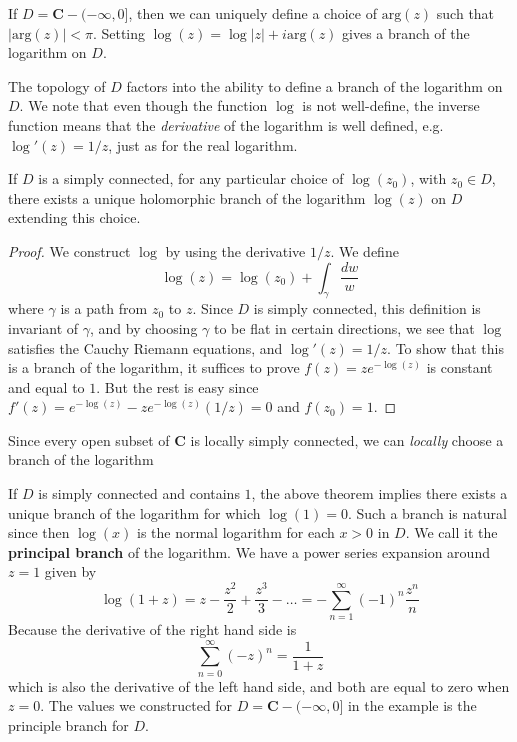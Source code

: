 \begin{example}
    If $D = \mathbf{C} - (-\infty,0]$, then we can uniquely define a choice of $\text{arg}(z)$ such that $|\text{arg}(z)| < \pi$. Setting $\log(z) = \log |z| + i \text{arg}(z)$ gives a branch of the logarithm on $D$.
\end{example}

The topology of $D$ factors into the ability to define a branch of the logarithm on $D$. We note that even though the function $\log$ is not well-define, the inverse function means that the {\it derivative} of the logarithm is well defined, e.g. $\log'(z) = 1/z$, just as for the real logarithm.

\begin{theorem}
    If $D$ is a simply connected, for any particular choice of $\log(z_0)$, with $z_0 \in D$, there exists a unique holomorphic branch of the logarithm $\log(z)$ on $D$ extending this choice.
\end{theorem}
\begin{proof}
    We construct $\log$ by using the derivative $1/z$. We define
    \[ \log(z) = \log(z_0) + \int_\gamma \frac{dw}{w} \]
    where $\gamma$ is a path from $z_0$ to $z$. Since $D$ is simply connected, this definition is invariant of $\gamma$, and by choosing $\gamma$ to be flat in certain directions, we see that $\log$ satisfies the Cauchy Riemann equations, and $\log'(z) = 1/z$. To show that this is a branch of the logarithm, it suffices to prove $f(z) = ze^{- \log(z)}$ is constant and equal to $1$. But the rest is easy since $f'(z) = e^{- \log(z)} - ze^{- \log(z)}(1/z) = 0$ and $f(z_0) = 1$.
\end{proof}

Since every open subset of $\mathbf{C}$ is locally simply connected, we can {\it locally} choose a branch of the logarithm 

If $D$ is simply connected and contains $1$, the above theorem implies there exists a unique branch of the logarithm for which $\log(1) = 0$. Such a branch is natural since then $\log(x)$ is the normal logarithm for each $x > 0$ in $D$. We call it the {\bf principal branch} of the logarithm. We have a power series expansion around $z = 1$ given by
%
\[ \log(1 + z) = z - \frac{z^2}{2} + \frac{z^3}{3} - \dots = - \sum_{n = 1}^\infty (-1)^n \frac{z^n}{n} \]
%
Because the derivative of the right hand side is
%
\[ \sum_{n = 0}^\infty (-z)^n = \frac{1}{1 + z} \]
%
which is also the derivative of the left hand side, and both are equal to zero when $z = 0$. The values we constructed for $D = \mathbf{C} - (-\infty,0]$ in the example is the principle branch for $D$.

